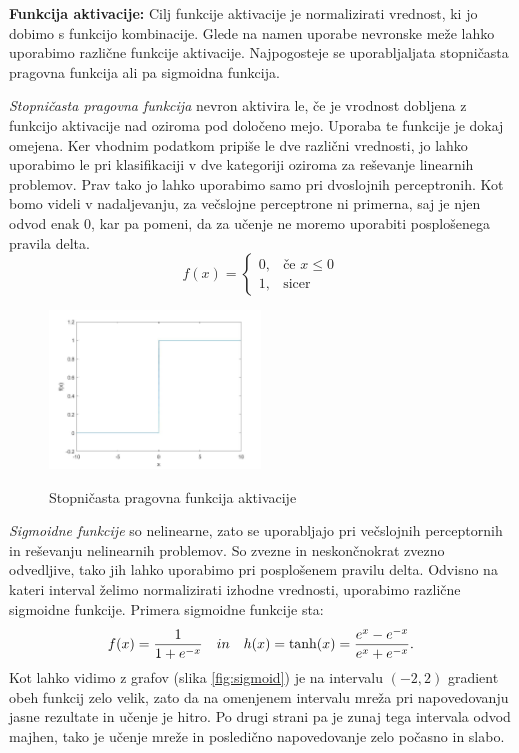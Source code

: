 \documentclass[mat1]{fmfdelo}
\begin{document}
\textbf{Funkcija aktivacije:}
Cilj funkcije aktivacije je normalizirati vrednost, ki jo dobimo s funkcijo kombinacije. Glede na namen uporabe nevronske meže lahko uporabimo različne funkcije aktivacije. Najpogosteje se uporabljaljata stopničasta pragovna funkcija ali pa sigmoidna funkcija.
%

\emph{Stopničasta pragovna funkcija} nevron aktivira le, če je vrodnost dobljena z funkcijo aktivacije nad oziroma pod določeno mejo. Uporaba te funkcije je dokaj omejena. Ker vhodnim podatkom pripiše le dve različni vrednosti, jo lahko uporabimo le pri klasifikaciji v dve kategoriji oziroma za reševanje linearnih problemov. Prav tako jo lahko uporabimo samo pri dvoslojnih perceptronih. Kot bomo videli v nadaljevanju, za večslojne perceptrone ni primerna, saj je njen odvod enak $0$, kar pa pomeni, da za učenje ne moremo uporabiti posplošenega pravila delta.
%
\begin{equation*}
f(x)=
    \begin{cases}
      0, & \text{če } x  \leq 0 \\
      1, & \text{sicer}
    \end{cases} 
\end{equation*}
%
\begin{figure}[!ht]
  \centering
    \includegraphics[width=0.5\textwidth]{step_fun.jpg}
  \label{fig:step}
 \caption{Stopničasta pragovna funkcija aktivacije}
\end{figure}
%

\emph{Sigmoidne funkcije} so nelinearne, zato se uporabljajo pri večslojnih perceptornih in reševanju nelinearnih problemov. So zvezne in neskončnokrat zvezno odvedljive, tako jih lahko uporabimo pri posplošenem pravilu delta. Odvisno na kateri interval želimo normalizirati izhodne vrednosti, uporabimo različne sigmoidne funkcije. Primera sigmoidne funkcije sta: 
%
\begin{equation}
f(x) = \frac{1}{1+e^{-x}} \quad in \quad h(x) = \tanh(x) = \frac{e^x-e^{-x}}{e^x+e^{-x}} \text.
\end{equation}
%
Kot lahko vidimo z grafov (slika \ref{fig:sigmoid}) je na intervalu $(-2,2)$ gradient obeh funkcij zelo velik, zato da na omenjenem intervalu mreža pri napovedovanju jasne rezultate in učenje je hitro. Po drugi strani pa je zunaj tega intervala odvod majhen, tako je učenje mreže in posledično napovedovanje zelo počasno in slabo.
\end{document}
